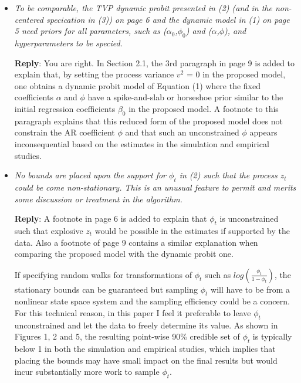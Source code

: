 \documentclass[12pt]{article}
\begin{document}
\begin{itemize}
\item \textit{To be comparable, the TVP dynamic probit presented in (2) (and in the
non-centered specication in (3)) on page 6 and the dynamic model in (1)
on page 5 need priors for all parameters, such as ($\alpha_0$,$\phi_0$) and ($\alpha$,$\phi$), and
hyperparameters to be specied.}

\textbf{Reply}: You are right. In Section 2.1, the 3rd paragraph in page 9 is added to explain that, by setting the process variance $v^2$ = 0 in the proposed model, one obtains a dynamic probit model of Equation (1) where the fixed coefficients $\alpha$ and $\phi$ have a spike-and-slab or horseshoe prior similar to the initial regression coefficients $\beta_0$ in the proposed model. A footnote to this paragraph explains that this reduced form of the proposed model does not constrain the AR coefficient $\phi$ and that such an unconstrained $\phi$ appears inconsequential based on the estimates in the simulation and empirical studies. 

\item \textit{No bounds are placed upon the support for $\phi_t$ in (2) such that the process
$z_t$ could be come non-stationary. This is an unusual feature to permit and
merits some discussion or treatment in the algorithm.}

\textbf{Reply}: A footnote in page 6 is added to explain that $\phi_t$ is unconstrained such that explosive $z_t$ would be possible in the estimates if supported by the data. Also a footnote of page 9 contains a similar explanation when comparing the proposed model with the dynamic probit one.

If specifying random walks for transformations of $\phi_t$ such as $log(\frac{\phi_t}{1-\phi_t})$, the stationary bounds can be guaranteed but sampling $\phi_t$ will have to be from a nonlinear state space system and the sampling efficiency could be a concern. For this technical reason, in this paper I feel it preferable to leave $\phi_t$ unconstrained and let the data to freely determine its value. As shown in Figures 1, 2 and 5, the resulting point-wise 90\% credible set of $\phi_t$ is typically below 1 in both the simulation and empirical studies, which implies that placing the bounds may have small impact on the final results but would incur substantially more work to sample $\phi_t$.




\end{itemize}
\end{document}
